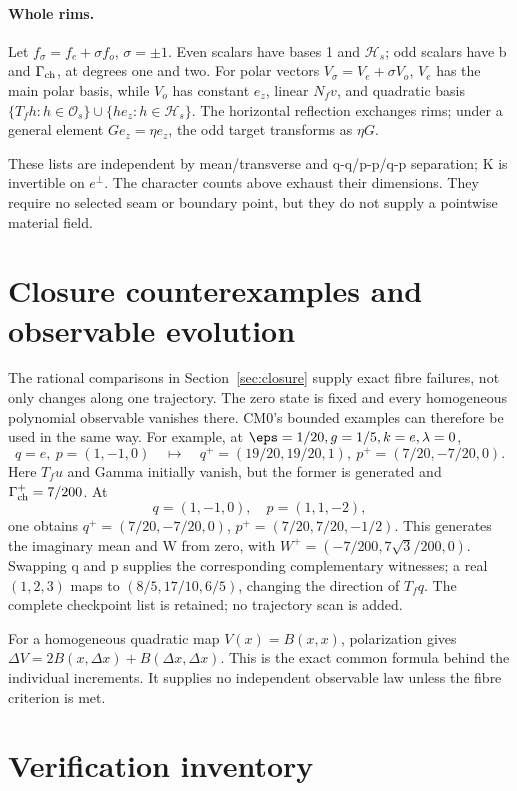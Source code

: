 \paragraph{Whole rims.}
Let \(f_\sigma=f_e+\sigma f_o\), \(\sigma=\pm1\). Even scalars have bases 1 and \(\mathcal H_s\); odd scalars have b and \(\Gamma_{\rm ch}\), at degrees one and two. For polar vectors \(V_\sigma=V_e+\sigma V_o\), \(V_e\) has the main polar basis, while \(V_o\) has constant \(e_z\), linear \(N_fv\), and quadratic basis
\(\{T_fh:h\in\mathcal O_s\}\cup\{he_z:h\in\mathcal H_s\}\).
The horizontal reflection exchanges rims; under a general element \(Ge_z=\eta e_z\), the odd target transforms as \(\eta G\).

These lists are independent by mean/transverse and q-q/p-p/q-p separation; K is invertible on \(e^\perp\). The character counts above exhaust their dimensions. They require no selected seam or boundary point, but they do not supply a pointwise material field.

\section{Closure counterexamples and observable evolution}\label{app:closure}
The rational comparisons in Section~\ref{sec:closure} supply exact fibre failures, not only changes along one trajectory. The zero state is fixed and every homogeneous polynomial observable vanishes there. CM0's bounded examples can therefore be used in the same way. For example, at \(\eps=1/20,g=1/5,k=e,\lambda=0\),
\[
q=e,\ p=(1,-1,0)\quad\mapsto\quad
q^+=(19/20,19/20,1),\ p^+=(7/20,-7/20,0).
\]
Here \(T_fu\) and Gamma initially vanish, but the former is generated and
\(\Gamma_{\rm ch}^+=7/200\). At
\[
q=(1,-1,0),\quad p=(1,1,-2),
\]
one obtains \(q^+=(7/20,-7/20,0)\),
\(p^+=(7/20,7/20,-1/2)\). This generates the imaginary mean and W from zero, with \(W^+=(-7/200,7\sqrt3/200,0)\).
Swapping q and p supplies the corresponding complementary witnesses; a real \((1,2,3)\) maps to \((8/5,17/10,6/5)\), changing the direction of \(T_fq\).
The complete checkpoint list is retained; no trajectory scan is added.

For a homogeneous quadratic map \(V(x)=B(x,x)\), polarization gives
\(\Delta V=2B(x,\Delta x)+B(\Delta x,\Delta x)\). This is the exact common formula behind the individual increments. It supplies no independent observable law unless the fibre criterion is met.

\section{Verification inventory}\label{app:verification}

